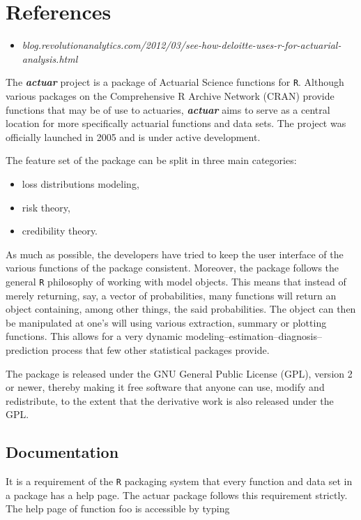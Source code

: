 \documentclass[12pt]{article}
\begin{document}
\section{References}
\begin{itemize}
\item \textit{\small{blog.revolutionanalytics.com/2012/03/see-how-deloitte-uses-r-for-actuarial-analysis.html}}
\end{itemize}

The \textbf{\textit{actuar}} project is a package of Actuarial Science functions for \texttt{R}. Although various packages on the Comprehensive R Archive Network (CRAN) provide functions that may be of use to actuaries, \textbf{\textit{actuar}} aims to serve as a central location for more specifically actuarial functions and data sets. The project was officially launched in 2005 and is under active development.

The feature set of the package can be split in three main categories: 
\begin{itemize}
\item loss distributions modeling,
\item risk theory,
\item credibility theory.
\end{itemize}

As much as possible, the developers have tried to keep the user interface of the various functions of the package consistent. Moreover, the package follows the general \texttt{R} philosophy of working with model objects. This means that instead of merely returning, say, a vector of probabilities, many functions will return an object containing, among other things, the said probabilities. The object can then be manipulated at one's will using various extraction, summary or plotting functions. This allows for a very dynamic modeling–estimation–diagnosis–prediction process that few other statistical packages provide.

The package is released under the GNU General Public License (GPL), version 2 or newer, thereby making it free software that anyone can use, modify and redistribute, to the extent that the derivative work is also released under the GPL.

\subsection{Documentation}

It is a requirement of the \texttt{R} packaging system that every function and data set in a package has a help page. The actuar package follows this requirement strictly. The help page of function foo is accessible by typing
\end{document}
